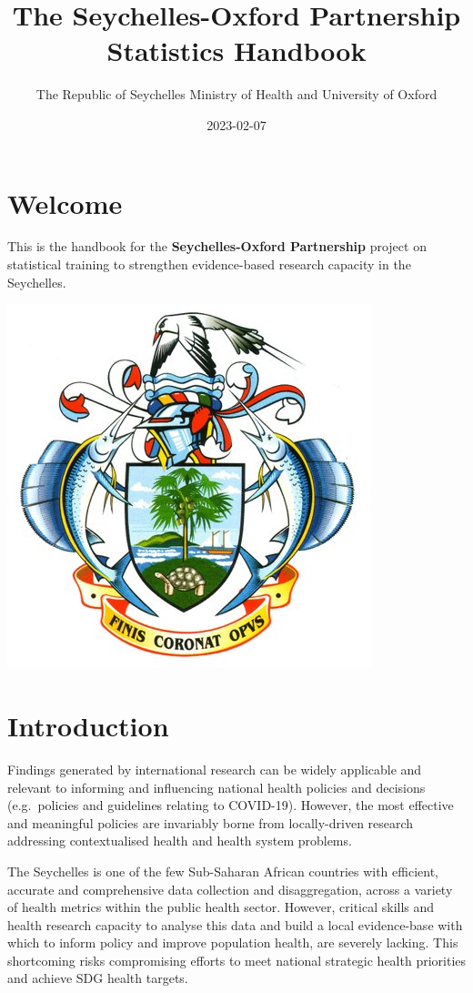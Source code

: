\documentclass[
  12pt,
]{book}
\title{The Seychelles-Oxford Partnership Statistics Handbook}
\author{The Republic of Seychelles Ministry of Health and University of Oxford}
\date{2023-02-07}
\begin{document}
\maketitle

{
\hypersetup{linkcolor=}
\setcounter{tocdepth}{1}
\tableofcontents
}
\hypertarget{welcome}{%
\chapter*{Welcome}\label{welcome}}

This is the handbook for the \textbf{Seychelles-Oxford Partnership} project on statistical training to strengthen evidence-based research capacity in the Seychelles.

\includegraphics{images/sc_moh.jpg}

\hypertarget{introduction}{%
\chapter{Introduction}\label{introduction}}

Findings generated by international research can be widely applicable and relevant to informing and influencing national health policies and decisions (e.g.~policies and guidelines relating to COVID-19). However, the most effective and meaningful policies are invariably borne from locally-driven research addressing contextualised health and health system problems.

The Seychelles is one of the few Sub-Saharan African countries with efficient, accurate and comprehensive data collection and disaggregation, across a variety of health metrics within the public health sector. However, critical skills and health research capacity to analyse this data and build a local evidence-base with which to inform policy and improve population health, are severely lacking. This shortcoming risks compromising efforts to meet national strategic health priorities and achieve SDG health targets.
\end{document}
